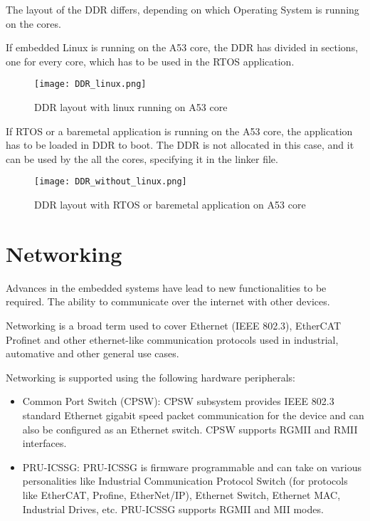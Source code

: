 The layout of the DDR differs, depending on which Operating System is running
on the cores.

If embedded Linux is running on the A53 core, the DDR has divided in sections,
one for every core, which has to be used in the RTOS application.

\begin{figure}[ht]
    \centering
    \texttt{[image: DDR\_linux.png]}
    \caption{DDR layout with linux running on A53 core}
\end{figure}

If RTOS or a baremetal application is running on the A53 core, the application
has to be loaded in DDR to boot.
The DDR is not allocated in this case, and it can be used by the all the cores,
specifying it in the linker file.

\begin{figure}[ht]
    \centering
    \texttt{[image: DDR\_without\_linux.png]}
    \caption{DDR layout with RTOS or baremetal application on A53 core}
\end{figure}

\section{Networking}

Advances in the embedded systems have lead to new functionalities to be
required. The ability to communicate over the internet with other devices.

Networking is a broad term used to cover Ethernet (IEEE 802.3), EtherCAT
Profinet and other ethernet-like communication protocols used in industrial,
automative and other general use cases.

Networking is supported using the following hardware peripherals:

\begin{itemize}
    \item   Common Port Switch (CPSW): CPSW subsystem provides IEEE 802.3
            standard Ethernet gigabit speed packet communication for the
            device and can also be configured as an Ethernet switch.
            CPSW supports RGMII and RMII interfaces.
    
    \item   PRU-ICSSG: PRU-ICSSG is firmware programmable and can take on
            various personalities like Industrial Communication Protocol Switch
            (for protocols like EtherCAT, Profine, EtherNet/IP), Ethernet
            Switch, Ethernet MAC, Industrial Drives, etc. PRU-ICSSG supports
            RGMII and MII modes.
\end{itemize}

